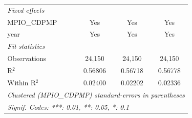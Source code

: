 \begin{tabular}{lccc}
   \midrule
   \emph{Fixed-effects}\\
   MPIO\_CDPMP                         & Yes                 & Yes                        & Yes\\  
   year                                & Yes                 & Yes                        & Yes\\  
   \midrule
   \emph{Fit statistics}\\
   Observations                        & 24,150              & 24,150                     & 24,150\\  
   R$^2$                               & 0.56806             & 0.56718                    & 0.56778\\  
   Within R$^2$                        & 0.02400             & 0.02202                    & 0.02336\\  
   \midrule \midrule
   \multicolumn{4}{l}{\emph{Clustered (MPIO\_CDPMP) standard-errors in parentheses}}\\
   \multicolumn{4}{l}{\emph{Signif. Codes: ***: 0.01, **: 0.05, *: 0.1}}\\
\end{tabular}
\par\endgroup


